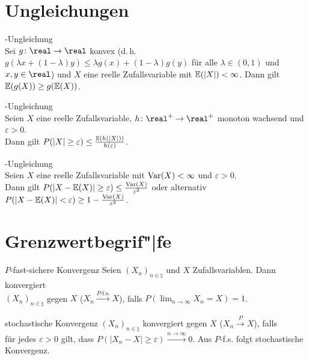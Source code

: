 \section{%
    Ungleichungen%
}

\begin{Def}{-Ungleichung}\\
    Sei $g\colon \real \rightarrow \real$ konvex
    (d.\,h. $g(\lambda x + (1-\lambda) y) \le \lambda g(x) + (1-\lambda) g(y)$
    für alle $\lambda \in (0, 1)$ und $x, y \in \real$) und
    $X$ eine reelle Zufallsvariable mit $\mathbb{E}(|X|) < \infty$.
    Dann gilt $\mathbb{E}(g(X)) \ge g(\mathbb{E}(X))$.
\end{Def}

\begin{Def}{-Ungleichung}\\
    Seien $X$ eine reelle Zufallsvariable, $h\colon \real^+ \rightarrow \real^+$
    monoton wachsend und $\varepsilon > 0$.\\
    Dann gilt $P(|X| \ge \varepsilon) \le \frac{\mathbb{E}(h(|X|))}{h(\varepsilon)}$.
\end{Def}

\begin{Def}{-Ungleichung}\\
    Seien $X$ eine reelle Zufallsvariable mit $\mathrm{Var}(X) < \infty$
    und $\varepsilon > 0$.\\
    Dann gilt $P(|X - \mathbb{E}(X)| \ge \varepsilon) \le \frac{\mathrm{Var}(X)}{\varepsilon^2}$ oder alternativ
    $P(|X - \mathbb{E}(X)| < \varepsilon) \ge 1 - \frac{\mathrm{Var}(X)}{\varepsilon^2}$.
\end{Def}

\section{%
    Grenzwertbegrif"|fe%
}

\begin{Def}{$P$-fast-sichere Konvergenz}
    Seien $(X_n)_{n \in \natural}$ und $X$ Zufallsvariablen.
    Dann konvergiert\\
    $(X_n)_{n \in \natural}$  gegen $X$
    ($X_n \xrightarrow{P\text{-f.s.}} X$),
    falls $P(\lim_{n \to \infty} X_n = X) = 1$.
\end{Def}

\begin{Def}{stochastische Konvergenz}
    $(X_n)_{n \in \natural}$ konvergiert  gegen $X$
    ($X_n \xrightarrow{P} X$), falls\\
    für jedes $\varepsilon > 0$ gilt, dass
    $P(|X_n - X| \ge \varepsilon) \xrightarrow{n \to \infty} 0$.
    Aus $P$-f.s. folgt stochastische Konvergenz.
\end{Def}

